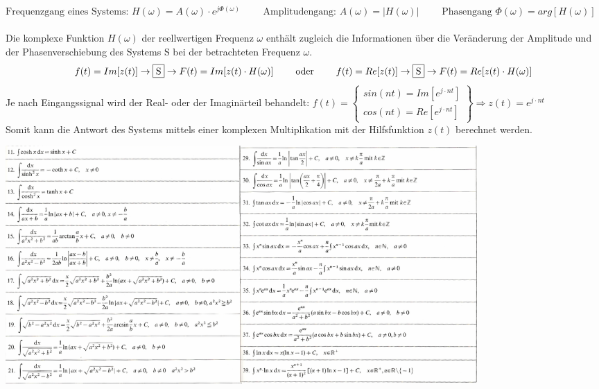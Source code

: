 $ \text{Frequenzgang eines Systems: } H(\omega) = A(\omega) \cdot e^{j \Phi(\omega)} \qquad 
\text{ Amplitudengang: } A(\omega) = |H(\omega)| \qquad \text{ Phasengang } \Phi(\omega) = arg[H(\omega)] $ \\ \\
Die komplexe Funktion $H(\omega)$ der reellwertigen Frequenz $\omega$ enthält zugleich die Informationen über 
die Veränderung der Amplitude und der Phasenverschiebung des Systems S bei der betrachteten Frequenz $\omega$.
$$f(t) = Im[z(t)] \to \fbox{S}\to F(t) = Im[z(t) \cdot H(\omega)] \qquad \text{ oder } 
\qquad f(t) = Re[z(t)] \to \fbox{S}\to F(t) = Re[z(t) \cdot H(\omega)]$$
Je nach Eingangssignal wird der Real- oder der Imaginärteil behandelt: 
$ f(t) = 
		\left\{
		\begin{array}{l}
           sin(n t) = Im[e^{j \cdot n t}]\\
           cos(n t) = Re[e^{j \cdot n t}]
        \end{array}
		\right\}
\Longrightarrow
z(t) = e^{j \cdot n t}
$ \\

Somit kann die Antwort des Systems mittels einer komplexen Multiplikation mit der Hilfsfunktion $z(t)$ berechnet werden.


\begin{center}
\includegraphics[width=18cm]{./bilder/integral2.png}
\end{center}




\newpage
{}

